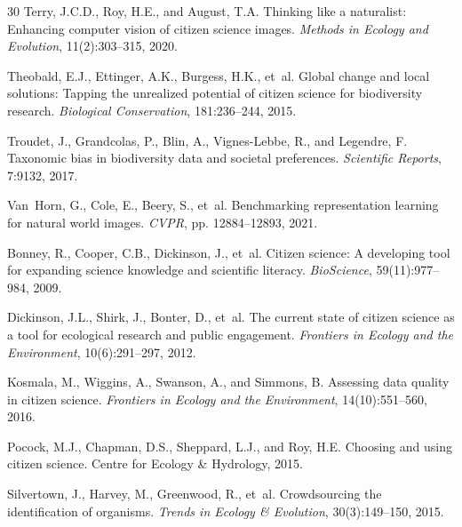 \documentclass[11pt,a4paper]{article}
\begin{document}
\begin{thebibliography}{30}
Terry, J.C.D., Roy, H.E., and August, T.A.
\newblock Thinking like a naturalist: Enhancing computer vision of citizen
  science images.
\newblock \emph{Methods in Ecology and Evolution}, 11(2):303--315, 2020.

Theobald, E.J., Ettinger, A.K., Burgess, H.K., et~al.
\newblock Global change and local solutions: Tapping the unrealized potential
  of citizen science for biodiversity research.
\newblock \emph{Biological Conservation}, 181:236--244, 2015.

Troudet, J., Grandcolas, P., Blin, A., Vignes-Lebbe, R., and Legendre, F.
\newblock Taxonomic bias in biodiversity data and societal preferences.
\newblock \emph{Scientific Reports}, 7:9132, 2017.

Van~Horn, G., Cole, E., Beery, S., et~al.
\newblock Benchmarking representation learning for natural world images.
\newblock \emph{CVPR}, pp. 12884--12893, 2021.

Bonney, R., Cooper, C.B., Dickinson, J., et~al.
\newblock Citizen science: A developing tool for expanding science knowledge
  and scientific literacy.
\newblock \emph{BioScience}, 59(11):977--984, 2009.

Dickinson, J.L., Shirk, J., Bonter, D., et~al.
\newblock The current state of citizen science as a tool for ecological
  research and public engagement.
\newblock \emph{Frontiers in Ecology and the Environment}, 10(6):291--297, 2012.

Kosmala, M., Wiggins, A., Swanson, A., and Simmons, B.
\newblock Assessing data quality in citizen science.
\newblock \emph{Frontiers in Ecology and the Environment}, 14(10):551--560, 2016.

Pocock, M.J., Chapman, D.S., Sheppard, L.J., and Roy, H.E.
\newblock Choosing and using citizen science.
\newblock Centre for Ecology \& Hydrology, 2015.

Silvertown, J., Harvey, M., Greenwood, R., et~al.
\newblock Crowdsourcing the identification of organisms.
\newblock \emph{Trends in Ecology \& Evolution}, 30(3):149--150, 2015.


\end{thebibliography}
\end{document}
